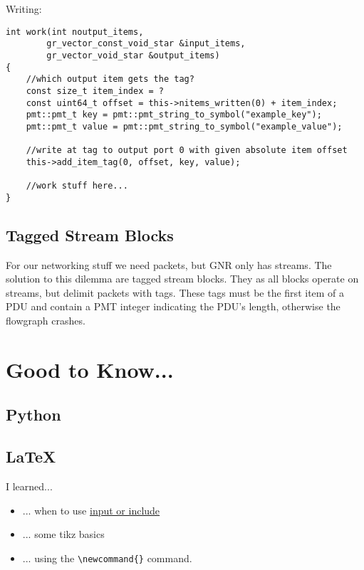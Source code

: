 \documentclass{article}
\begin{document}
\bigskip

Writing:
\begin{verbatim}
int work(int noutput_items,
		gr_vector_const_void_star &input_items,
		gr_vector_void_star &output_items)
{
	//which output item gets the tag?
	const size_t item_index = ? 
	const uint64_t offset = this->nitems_written(0) + item_index;
	pmt::pmt_t key = pmt::pmt_string_to_symbol("example_key");
	pmt::pmt_t value = pmt::pmt_string_to_symbol("example_value");
	
	//write at tag to output port 0 with given absolute item offset
	this->add_item_tag(0, offset, key, value);
	
	//work stuff here...
}
\end{verbatim}

\subsection{Tagged Stream Blocks}

For our networking stuff we need packets, but GNR only has streams. The solution to this dilemma are tagged stream blocks. They as all blocks operate on streams, but delimit packets with tags. These tags must be the first item of a PDU and contain a PMT integer indicating the PDU's length, otherwise the flowgraph crashes.

\section{Good to Know...}

\subsection{Python}

\subsection{\LaTeX}

I learned...

\begin{itemize}
	\item ... when to use \href{https://tex.stackexchange.com/questions/246/when-should-i-use-input-vs-include}{input or include}
	\item ... some tikz basics
	\item ... using the \verb|\newcommand{}| command.
\end{itemize}
\end{document}
